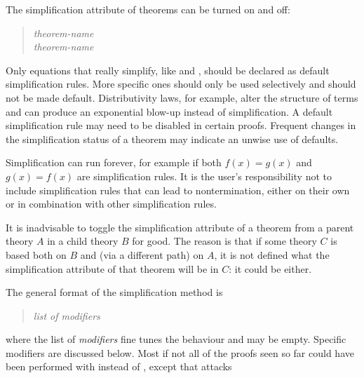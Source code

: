 \begin{isabellebody}
\begin{isamarkuptext}
The simplification attribute of theorems can be turned on and off:%
\begin{quote}
 \textit{theorem-name}\\
 \textit{theorem-name}
\end{quote}
Only equations that really simplify, like  and
, should be declared as default simplification rules. 
More specific ones should only be used selectively and should
not be made default.  Distributivity laws, for example, alter
the structure of terms and can produce an exponential blow-up instead of
simplification.  A default simplification rule may
need to be disabled in certain proofs.  Frequent changes in the simplification
status of a theorem may indicate an unwise use of defaults.
\begin{warn}
  Simplification can run forever, for example if both $f(x) = g(x)$ and
  $g(x) = f(x)$ are simplification rules. It is the user's responsibility not
  to include simplification rules that can lead to nontermination, either on
  their own or in combination with other simplification rules.
\end{warn}
\begin{warn}
  It is inadvisable to toggle the simplification attribute of a
  theorem from a parent theory $A$ in a child theory $B$ for good.
  The reason is that if some theory $C$ is based both on $B$ and (via a
  different path) on $A$, it is not defined what the simplification attribute
  of that theorem will be in $C$: it could be either.
\end{warn}%
\end{isamarkuptext}%
\isamarkuptrue%
%
\isamarkuptrue%
%
\begin{isamarkuptext}%
The general format of the simplification method is
\begin{quote}
\isa{simp} \textit{list of modifiers}
\end{quote}
where the list of \emph{modifiers} fine tunes the behaviour and may
be empty. Specific modifiers are discussed below.  Most if not all of the
proofs seen so far could have been performed
with \isa{simp} instead of \isa{auto}, except that \isa{simp} attacks

\end{isamarkuptext}
\end{isabellebody}
